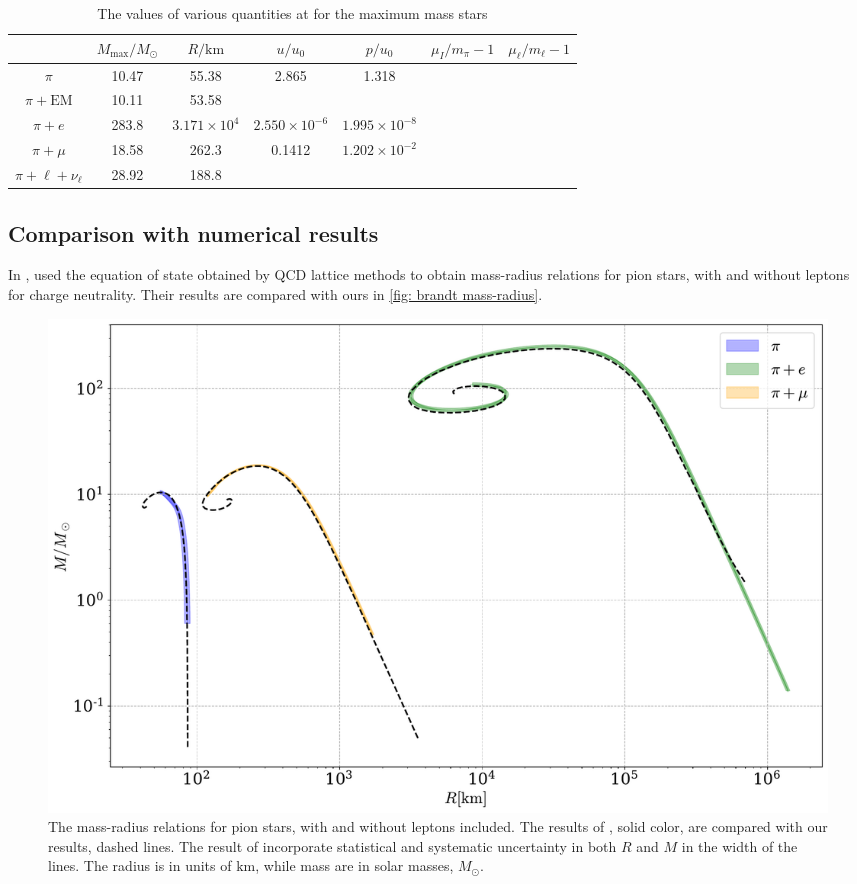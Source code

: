 \begin{table}[!htb]
    \centering
    \caption{The values of various quantities at for the maximum mass stars}
    \begin{tabular}{c  c  c  c  c c c}
        \hline \hline
        & $M_\text{max}/M_\odot$ & $R / \text{km}$ & $u/u_0$ & $p/u_0$ & $\mu_I/m_\pi-1$ & $\mu_\ell/m_\ell-1$ \\
        \hline
        $\pi$& 10.47 & 55.38 & 2.865 & 1.318 && \\
        $\pi + \text{EM}$& 10.11 & 53.58 &&&& \\
        $\pi + e$& 283.8 & $3.171 \times10^4$ & $2.550\times10^{-6}$ & $1.995\times10^{-8}$ && \\
        $\pi + \mu$& 18.58 & 262.3 & 0.1412 & $1.202\times 10^{-2}$ && \\
        $\pi + \ell + \nu_\ell$& 28.92 & 188.8 &  &  &&
    \end{tabular}
\end{table}



\subsection{Comparison with numerical results}

In \autocite{brandtNewClassCompact2018}, \citeauthor{brandtNewClassCompact2018} used the equation of state obtained by QCD lattice methods to obtain mass-radius relations for pion stars, with and without leptons for charge neutrality.
Their results are compared with ours in  \autoref{fig: brandt mass-radius}.


\begin{figure}[!htb]
    \centering
    \includegraphics[width=\textwidth]{../scripts/figurer/pion_star/mass_radius_brandt.pdf}
    \caption{
        The mass-radius relations for pion stars, with and without leptons included.
        The results of \citeauthor{brandtNewClassCompact2018}, solid color, are compared with our results, dashed lines.
        The result of \citeauthor{brandtNewClassCompact2018} incorporate statistical and systematic uncertainty in both $R$ and $M$ in the width of the lines.
        The radius is in units of $\text{km}$, while mass are in solar masses, $M_\odot$.
    }
    \label{fig: brandt mass-radius}
\end{figure}


